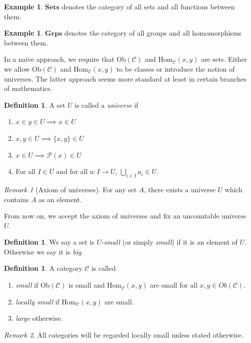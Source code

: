 \documentclass[12pt]{report}
\theoremstyle{plain}
\theoremstyle{remark}
\newtheorem*{remark}{Remark}
\theoremstyle{definition}
\newtheorem{definition}[theorem]{Definition}
\newtheorem{example}[theorem]{Example}
\begin{document}
\begin{example}
   $\mathbf{Sets}$ denotes the category of all sets and all functions between them.
\end{example}

\begin{example}
    $\mathbf{Grps}$ denotes the category of all groups and all homomorphisms between them.
\end{example}

In a naive approach, we require that $\mathrm{Ob}(\mathcal{C})$ and $\mathrm{Hom}_\mathcal{C}(x,y)$ are sets. Either we allow $\mathrm{Ob}(\mathcal{C})$ and $\mathrm{Hom}_\mathcal{C}(x,y)$ to be classes or introduce the notion of universes. The latter approach seems more standard at least in certain branches of mathematics.

\begin{definition}
    A set $U$ is called a \emph{universe} if
    \begin{enumerate}
        \item $x\in y\in U\implies x\in U$
        \item $x,y\in U\implies \{x,y\}\in U$
        \item $x\in U \implies \mathcal{P}(x)\in U$
        \item For all $I\in U$ and for all $a:I\rightarrow U$, $\bigcup_{i\in I} a_i\in U$.
    \end{enumerate}
\end{definition}
\begin{remark}[Axiom of universes]
    For any set $A$, there exists a universe $U$ which contains $A$ as an element.
\end{remark}

From now on, we accept the axiom of universes and fix an uncountable universe $U$.

\begin{definition}
    We say a set is \emph{$U$-small} (or simply \emph{small}) if it is an element of $U$. Otherwise we say it is \emph{big}.
\end{definition}

\begin{definition}
    A category $\mathcal{C}$ is called
    \begin{enumerate}
        \item \emph{small} if $\mathrm{Ob}(\mathcal{C})$ is small and $\mathrm{Hom}_\mathcal{C}(x,y)$ are small for all $x,y\in Ob(\mathcal{C})$.
        \item \emph{locally small} if $\mathrm{Hom}_\mathcal{C}(x,y)$ are small.
        \item \emph{large} otherwise.
    \end{enumerate}
\end{definition}
\begin{remark}
    All categories will be regarded locally small unless stated otherwise.
\end{remark}
\end{document}
